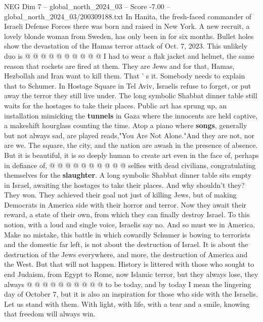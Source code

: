 \begin{textsample}{NEG Dim 7 – global\_north\_2024\_03 – Score -7.00 – global\_north\_2024\_03/200309188.txt}
In Hanita, the fresh-faced commander of Israeli Defense Forces there was born and raised in New York.
A new recruit, a lovely blonde woman from Sweden, has only been in for six months.
Bullet holes show the devastation of the Hamas terror attack of Oct. 7, 2023.
This unlikely duo is @ @ @ @ @ @ @ @ @ @ I had to wear a flak jacket and helmet, the same reason that rockets are fired at them.
They are Jews and for that, Hamas, Hezbollah and Iran want to kill them.
That ' s it.
Somebody needs to explain that to Schumer.
In Hostage Square in Tel Aviv, Israelis refuse to forget, or put away the terror they still live under.
The long symbolic Shabbat dinner table still waits for the hostages to take their places.
Public art has sprung up, an installation mimicking the \textbf{tunnels} in Gaza where the innocents are held captive, a makeshift hourglass counting the time.
Atop a piano where \textbf{songs}, generally but not always sad, are played reads,"You Are Not Alone."And they are not, nor are we.
The square, the city, and the nation are awash in the presence of absence.
But it is beautiful, it is so deeply human to create art even in the face of, perhaps in defiance of, @ @ @ @ @ @ @ @ @ @ selfies with dead civilians, congratulating themselves for the \textbf{slaughter}.
A long symbolic Shabbat dinner table sits empty in Israel, awaiting the hostages to take their places.
And why shouldn't they?
They won.
They achieved their goal not just of killing Jews, but of making Democrats in America side with their horror and terror.
Now they await their reward, a state of their own, from which they can finally destroy Israel.
To this notion, with a loud and single voice, Israelis say no.
And so must we in America.
Make no mistake, this battle in which cowardly Schumer is bowing to terrorists and the domestic far left, is not about the destruction of Israel.
It is about the destruction of the Jews everywhere, and more, the destruction of America and the West.
But that will not happen.
History is littered with those who sought to end Judaism, from Egypt to Rome, now Islamic terror, but they always lose, they always @ @ @ @ @ @ @ @ @ @ to be today, and by today I mean the lingering day of October 7, but it is also an inspiration for those who side with the Israelis.
Let us stand with them.
With light, with life, with a tear and a smile, knowing that freedom will always win.

\end{textsample}
